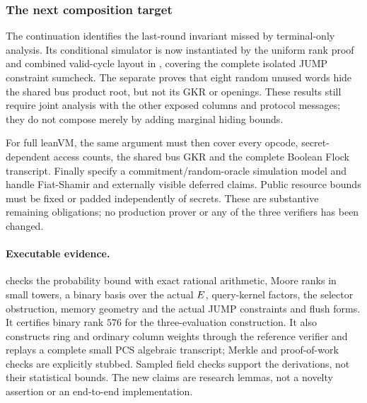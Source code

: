 \subsubsection{The next composition target}

The continuation  identifies the last-round invariant missed by terminal-only analysis. Its conditional simulator is now instantiated by the uniform rank proof and combined valid-cycle layout in , covering the complete isolated JUMP constraint sumcheck. The separate  proves that eight random unused words hide the shared bus product root, but not its GKR or openings. These results still require joint analysis with the other exposed columns and protocol messages; they do not compose merely by adding marginal hiding bounds.

For full leanVM, the same argument must then cover every opcode, secret-dependent access counts, the shared bus GKR and the complete Boolean Flock transcript. Finally specify a commitment/random-oracle simulation model and handle Fiat-Shamir and externally visible deferred claims. Public resource bounds must be fixed or padded independently of secrets. These are substantive remaining obligations; no production prover or any of the three verifiers has been changed.

\paragraph{Executable evidence.}  checks the probability bound with exact rational arithmetic, Moore ranks in small towers, a binary basis over the actual $E$, query-kernel factors, the selector obstruction, memory geometry and the actual JUMP constraints and flush forms. It certifies binary rank $576$ for the three-evaluation construction. It also constructs ring and ordinary column weights through the reference verifier and replays a complete small PCS algebraic transcript; Merkle and proof-of-work checks are explicitly stubbed. Sampled field checks support the derivations, not their statistical bounds. The new claims are research lemmas, not a novelty assertion or an end-to-end implementation.
